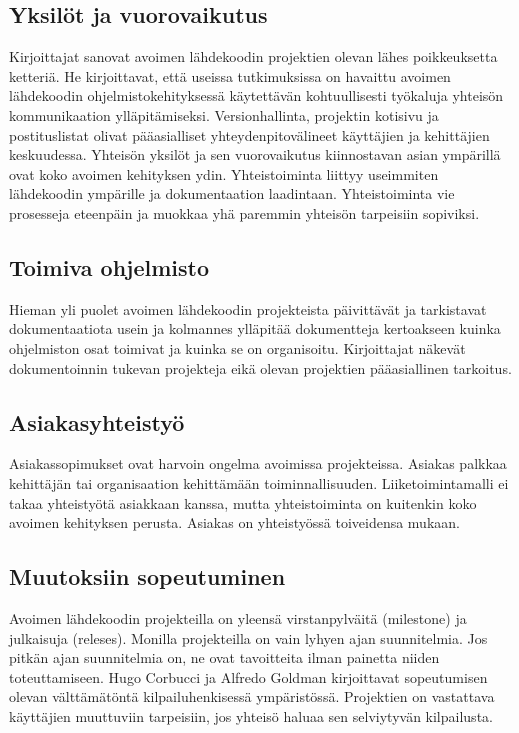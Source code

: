 \documentclass[finnish]{tktltiki2}
\theoremstyle{definition}
\theoremstyle{remark}
\begin{document}
\subsection{Yksilöt ja vuorovaikutus}

Kirjoittajat sanovat avoimen lähdekoodin projektien olevan lähes poikkeuksetta ketteriä. He kirjoittavat, että useissa tutkimuksissa on havaittu avoimen lähdekoodin ohjelmistokehityksessä käytettävän kohtuullisesti työkaluja yhteisön kommunikaation ylläpitämiseksi. Versionhallinta, projektin kotisivu ja postituslistat olivat pääasialliset yhteydenpitovälineet käyttäjien ja kehittäjien keskuudessa. 
Yhteisön yksilöt ja sen vuorovaikutus kiinnostavan asian ympärillä ovat koko avoimen kehityksen ydin. Yhteistoiminta liittyy useimmiten lähdekoodin ympärille ja dokumentaation laadintaan. Yhteistoiminta vie prosesseja eteenpäin ja muokkaa yhä paremmin yhteisön tarpeisiin sopiviksi.
 
\subsection{Toimiva ohjelmisto}

Hieman yli puolet avoimen lähdekoodin projekteista päivittävät ja tarkistavat dokumentaatiota usein ja kolmannes ylläpitää dokumentteja kertoakseen kuinka ohjelmiston osat toimivat ja kuinka se on organisoitu. Kirjoittajat näkevät dokumentoinnin tukevan projekteja eikä olevan projektien pääasiallinen tarkoitus.
\subsection{Asiakasyhteistyö}

Asiakassopimukset ovat harvoin ongelma avoimissa projekteissa. Asiakas palkkaa kehittäjän tai organisaation kehittämään toiminnallisuuden. Liiketoimintamalli ei takaa yhteistyötä asiakkaan kanssa, mutta yhteistoiminta on kuitenkin koko avoimen kehityksen perusta. Asiakas on yhteistyössä toiveidensa mukaan.
\subsection{Muutoksiin sopeutuminen}

Avoimen lähdekoodin projekteilla on yleensä virstanpylväitä (milestone) ja julkaisuja (releses). Monilla projekteilla on vain lyhyen ajan suunnitelmia. Jos pitkän ajan suunnitelmia on, ne ovat tavoitteita ilman painetta niiden toteuttamiseen. Hugo Corbucci ja Alfredo Goldman kirjoittavat sopeutumisen olevan välttämätöntä kilpailuhenkisessä ympäristössä. Projektien on vastattava käyttäjien muuttuviin tarpeisiin, jos yhteisö haluaa sen selviytyvän kilpailusta.
\end{document}
